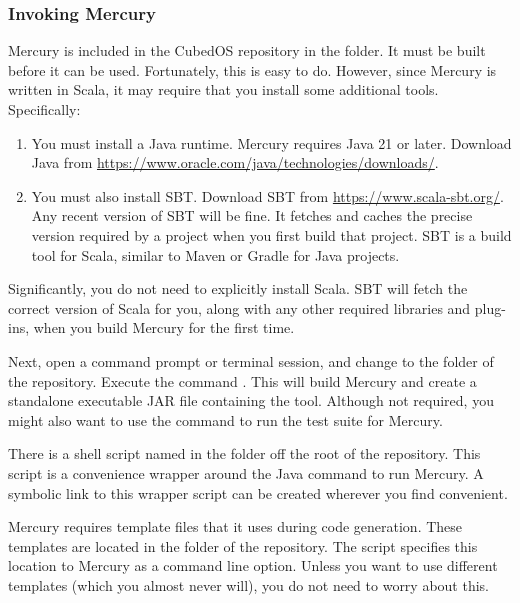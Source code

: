 \subsubsection{Invoking Mercury}

Mercury is included in the CubedOS repository in the  folder. It must be built
before it can be used. Fortunately, this is easy to do. However, since Mercury is written in
Scala, it may require that you install some additional tools. Specifically:

\begin{enumerate}
\item You must install a Java runtime. Mercury requires Java 21 or later. Download Java from
  \url{https://www.oracle.com/java/technologies/downloads/}.

\item You must also install SBT. Download SBT from \url{https://www.scala-sbt.org/}. Any recent
  version of SBT will be fine. It fetches and caches the precise version required by a project
  when you first build that project. SBT is a build tool for Scala, similar to Maven or Gradle
  for Java projects.
\end{enumerate}

Significantly, you do not need to explicitly install Scala. SBT will fetch the correct version
of Scala for you, along with any other required libraries and plug-ins, when you build Mercury
for the first time.

Next, open a command prompt or terminal session, and change to the  folder of
the repository. Execute the command . This will build Mercury and create a
standalone executable JAR file containing the tool. Although not required, you might also want
to use the command  to run the test suite for Mercury.

There is a shell script named  in the  folder off the root of
the repository. This script is a convenience wrapper around the Java command to run Mercury. A
symbolic link to this wrapper script can be created wherever you find convenient.

Mercury requires template files that it uses during code generation. These templates are located
in the  folder of the repository. The  script
specifies this location to Mercury as a command line option. Unless you want to use different
templates (which you almost never will), you do not need to worry about this.

